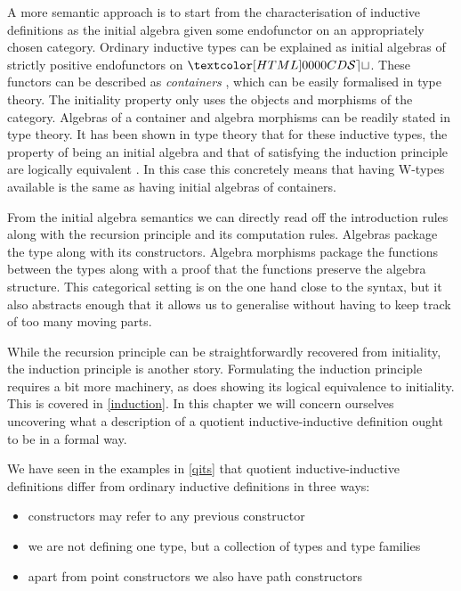 A more semantic approach is to start from the characterisation of
inductive definitions as the initial algebra given some endofunctor on
an appropriately chosen category. Ordinary inductive types can be
explained as initial algebras of strictly positive endofunctors on
$\SET$. These functors can be described as \emph{containers}
\cite{Abbott2005}, which can be easily formalised in type theory. The
initiality property only uses the objects and morphisms of the
category. Algebras of a container and algebra morphisms can be readily
stated in type theory. It has been shown in type theory that for these
inductive types, the property of being an initial algebra and that of
satisfying the induction principle are logically equivalent
\cite{Awodey2012}. In this case this concretely means that having
W-types available is the same as having initial algebras of
containers.

From the initial algebra semantics we can directly read off the
introduction rules along with the recursion principle and its
computation rules. Algebras package the type along with its
constructors. Algebra morphisms package the functions between the
types along with a proof that the functions preserve the algebra
structure. This categorical setting is on the one hand close to the
syntax, but it also abstracts enough that it allows us to generalise
without having to keep track of too many moving parts.

While the recursion principle can be straightforwardly recovered from
initiality, the induction principle is another story. Formulating the
induction principle requires a bit more machinery, as does showing its
logical equivalence to initiality. This is covered in
\cref{induction}. In this chapter we will concern ourselves uncovering
what a description of a quotient inductive-inductive definition ought
to be in a formal way.

We have seen in the examples in \cref{qits} that quotient
inductive-inductive definitions differ from ordinary inductive
definitions in three ways:
%
\begin{itemize}
\item constructors may refer to any previous constructor
\item we are not defining one type, but a collection of types and type
  families
\item apart from point constructors we also have path constructors
\end{itemize}

